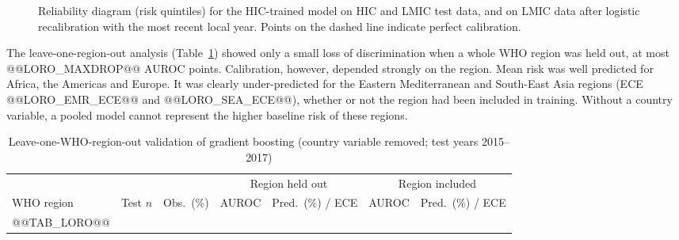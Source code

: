 \documentclass[11pt,a4paper]{article}
\begin{document}
\begin{figure}[t]
\centering
{}
\caption{Reliability diagram (risk quintiles) for the HIC-trained model on HIC and LMIC test data, and on LMIC data after logistic recalibration with the most recent local year. Points on the dashed line indicate perfect calibration.}
\label{fig:rel}
\end{figure}

The leave-one-region-out analysis (Table~\ref{tab:loro}) showed only a small loss of discrimination when a whole WHO region was held out, at most @@LORO_MAXDROP@@ AUROC points. Calibration, however, depended strongly on the region. Mean risk was well predicted for Africa, the Americas and Europe. It was clearly under-predicted for the Eastern Mediterranean and South-East Asia regions (ECE @@LORO_EMR_ECE@@ and @@LORO_SEA_ECE@@), whether or not the region had been included in training. Without a country variable, a pooled model cannot represent the higher baseline risk of these regions.

\begin{table}[t]
\caption{Leave-one-WHO-region-out validation of gradient boosting (country variable removed; test years 2015--2017)}\label{tab:loro}
\centering\footnotesize
\begin{tabular}{lrrcccc}
\toprule
 & & & \multicolumn{2}{c}{Region held out} & \multicolumn{2}{c}{Region included} \\
\cmidrule(lr){4-5}\cmidrule(lr){6-7}
WHO region & Test $n$ & Obs.\ (\%) & AUROC & Pred.\ (\%) / ECE & AUROC & Pred.\ (\%) / ECE \\
\midrule
@@TAB_LORO@@
\bottomrule
\end{tabular}
\end{table}
\end{document}
